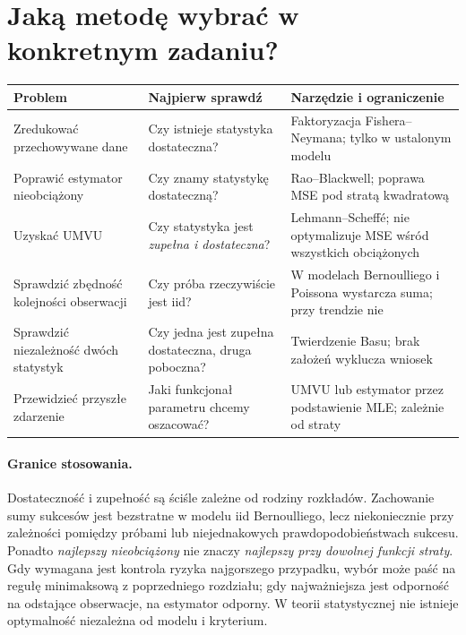 \documentclass[11pt,a4paper,oneside]{report}
\numberwithin{equation}{chapter}
\theoremstyle{plain}
\theoremstyle{definition}
\theoremstyle{remark}
\begin{document}
\section{Jaką metodę wybrać w konkretnym zadaniu?}
\begin{center}\small
\begin{tabular}{>{\raggedright\arraybackslash}p{}>{\raggedright\arraybackslash}p{}>{\raggedright\arraybackslash}p{}}
\toprule
\textbf{Problem} & \textbf{Najpierw sprawdź} & \textbf{Narzędzie i ograniczenie}\\
\midrule
Zredukować przechowywane dane & Czy istnieje statystyka dostateczna? & Faktoryzacja Fishera--Neymana; tylko w ustalonym modelu\\
Poprawić estymator nieobciążony & Czy znamy statystykę dostateczną? & Rao--Blackwell; poprawa MSE pod stratą kwadratową\\
Uzyskać UMVU & Czy statystyka jest \emph{zupełna i dostateczna}? & Lehmann--Scheffé; nie optymalizuje MSE wśród wszystkich obciążonych\\
Sprawdzić zbędność kolejności obserwacji & Czy próba rzeczywiście jest iid? & W modelach Bernoulliego i Poissona wystarcza suma; przy trendzie nie\\
Sprawdzić niezależność dwóch statystyk & Czy jedna jest zupełna dostateczna, druga poboczna? & Twierdzenie Basu; brak założeń wyklucza wniosek\\
Przewidzieć przyszłe zdarzenie & Jaki funkcjonał parametru chcemy oszacować? & UMVU lub estymator przez podstawienie MLE; zależnie od straty\\
\bottomrule
\end{tabular}
\end{center}

\paragraph{Granice stosowania.}
Dostateczność i zupełność są ściśle zależne od rodziny rozkładów.
Zachowanie sumy sukcesów jest bezstratne w modelu iid Bernoulliego,
lecz niekoniecznie przy zależności pomiędzy próbami lub niejednakowych
prawdopodobieństwach sukcesu. Ponadto \emph{najlepszy nieobciążony}
nie znaczy \emph{najlepszy przy dowolnej funkcji straty}.
Gdy wymagana jest kontrola ryzyka najgorszego przypadku,
wybór może paść na regułę minimaksową z poprzedniego rozdziału;
gdy najważniejsza jest odporność na odstające obserwacje,
na estymator odporny. W teorii statystycznej nie istnieje
optymalność niezależna od modelu i kryterium.
\end{document}
